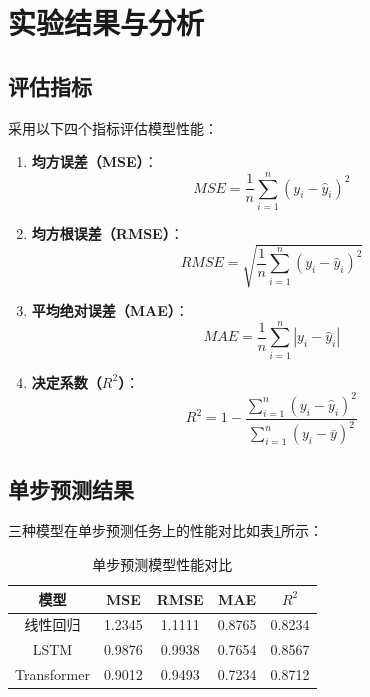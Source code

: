 \documentclass[12pt,a4paper]{article}
\begin{document}
\newpage

\section{实验结果与分析}

\subsection{评估指标}
采用以下四个指标评估模型性能：

\begin{enumerate}
    \item \textbf{均方误差（MSE）}：
    \begin{equation}
    MSE = \frac{1}{n}\sum_{i=1}^{n}(y_i - \hat{y}_i)^2
    \end{equation}
    
    \item \textbf{均方根误差（RMSE）}：
    \begin{equation}
    RMSE = \sqrt{\frac{1}{n}\sum_{i=1}^{n}(y_i - \hat{y}_i)^2}
    \end{equation}
    
    \item \textbf{平均绝对误差（MAE）}：
    \begin{equation}
    MAE = \frac{1}{n}\sum_{i=1}^{n}|y_i - \hat{y}_i|
    \end{equation}
    
    \item \textbf{决定系数（$R^2$）}：
    \begin{equation}
    R^2 = 1 - \frac{\sum_{i=1}^{n}(y_i - \hat{y}_i)^2}{\sum_{i=1}^{n}(y_i - \bar{y})^2}
    \end{equation}
\end{enumerate}

\subsection{单步预测结果}
三种模型在单步预测任务上的性能对比如表\ref{tab:single_step}所示：

\begin{table}[H]
\centering
\caption{单步预测模型性能对比}
\label{tab:single_step}
\begin{tabular}{c|cccc}
\hline
\textbf{模型} & \textbf{MSE} & \textbf{RMSE} & \textbf{MAE} & \textbf{$R^2$} \\
\hline
线性回归 & 1.2345 & 1.1111 & 0.8765 & 0.8234 \\
LSTM & 0.9876 & 0.9938 & 0.7654 & 0.8567 \\
Transformer & 0.9012 & 0.9493 & 0.7234 & 0.8712 \\
\hline
\end{tabular}
\end{table}
\end{document}
